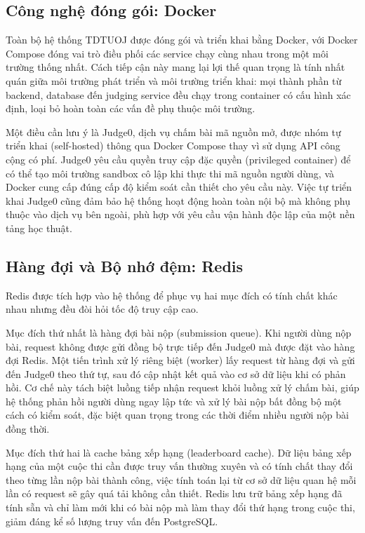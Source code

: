 \documentclass[12pt, a4paper]{report}
\begin{document}
\subsection{Công nghệ đóng gói: Docker}

Toàn bộ hệ thống TDTUOJ được đóng gói và triển khai bằng Docker, với Docker Compose đóng
vai trò điều phối các service chạy cùng nhau trong một môi trường thống nhất. Cách tiếp
cận này mang lại lợi thế quan trọng là tính nhất quán giữa môi trường phát triển và môi
trường triển khai: mọi thành phần từ backend, database đến judging service đều chạy trong
container có cấu hình xác định, loại bỏ hoàn toàn các vấn đề phụ thuộc môi trường.

Một điều cần lưu ý là Judge0, dịch vụ chấm bài mã nguồn mở, được nhóm tự triển
khai (self-hosted) thông qua Docker Compose thay vì sử dụng API công cộng có phí. Judge0
yêu cầu quyền truy cập đặc quyền (privileged container) để có thể tạo môi trường sandbox
cô lập khi thực thi mã nguồn người dùng, và Docker cung cấp đúng cấp độ kiểm soát cần
thiết cho yêu cầu này. Việc tự triển khai Judge0 cũng đảm bảo hệ thống hoạt động hoàn toàn
nội bộ mà không phụ thuộc vào dịch vụ bên ngoài, phù hợp với yêu cầu vận hành độc lập của
một nền tảng học thuật.

\subsection{Hàng đợi và Bộ nhớ đệm: Redis}

Redis được tích hợp vào hệ thống để phục vụ hai mục đích có tính chất khác nhau nhưng đều
đòi hỏi tốc độ truy cập cao.

Mục đích thứ nhất là hàng đợi bài nộp (submission queue). Khi người dùng nộp bài, request
không được gửi đồng bộ trực tiếp đến Judge0 mà được đặt vào hàng đợi Redis. Một tiến trình
xử lý riêng biệt (worker) lấy request từ hàng đợi và gửi đến Judge0 theo thứ tự, sau đó
cập nhật kết quả vào cơ sở dữ liệu khi có phản hồi. Cơ chế này tách biệt luồng tiếp nhận
request khỏi luồng xử lý chấm bài, giúp hệ thống phản hồi người dùng ngay lập tức và xử lý
bài nộp bất đồng bộ một cách có kiểm soát, đặc biệt quan trọng trong các thời điểm nhiều
người nộp bài đồng thời.

Mục đích thứ hai là cache bảng xếp hạng (leaderboard cache). Dữ liệu bảng xếp hạng của một
cuộc thi cần được truy vấn thường xuyên và có tính chất thay đổi theo từng lần nộp bài
thành công, việc tính toán lại từ cơ sở dữ liệu quan hệ mỗi lần có request sẽ gây quá tải
không cần thiết. Redis lưu trữ bảng xếp hạng đã tính sẵn và chỉ làm mới khi có bài nộp
mà làm thay đổi thứ hạng trong cuộc thi, giảm đáng kể số lượng truy vấn đến PostgreSQL.
\end{document}

